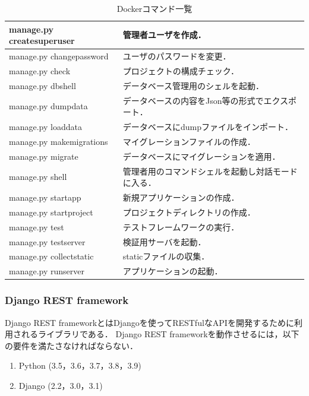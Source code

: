 \begin{table}[htb]
    \begin{center}
        \caption{Dockerコマンド一覧}
        \begin{tabularx}{\textwidth}{|l|X|}\hline
            manage.py createsuperuser & 管理者ユーザを作成． \\ \hline
            manage.py changepassword & ユーザのパスワードを変更． \\ \hline
            manage.py check & プロジェクトの構成チェック． \\ \hline
            manage.py dbshell & データベース管理用のシェルを起動． \\ \hline
            manage.py dumpdata & データベースの内容をJson等の形式でエクスポート． \\ \hline
            manage.py loaddata & データベースにdumpファイルをインポート． \\ \hline
            manage.py makemigrations & マイグレーションファイルの作成． \\ \hline
            manage.py migrate & データベースにマイグレーションを適用． \\ \hline
            manage.py shell & 管理者用のコマンドシェルを起動し対話モードに入る． \\ \hline
            manage.py startapp & 新規アプリケーションの作成． \\ \hline
            manage.py startproject & プロジェクトディレクトリの作成． \\ \hline
            manage.py test & テストフレームワークの実行． \\ \hline
            manage.py testserver & 検証用サーバを起動． \\ \hline
            manage.py collectstatic & staticファイルの収集． \\ \hline
            manage.py runserver & アプリケーションの起動． \\ \hline
        \end{tabularx}
        \label{django_command}
    \end{center}
\end{table}

\subsubsection{Django REST framework}
Django REST framework\cite{drf}とはDjangoを使ってRESTfulなAPIを開発するために利用されるライブラリである．
Django REST frameworkを動作させるには，以下の要件を満たさなければならない．
\begin{enumerate}
    \item Python (3.5，3.6，3.7，3.8，3.9)
    \item Django (2.2，3.0，3.1)
\end{enumerate}


